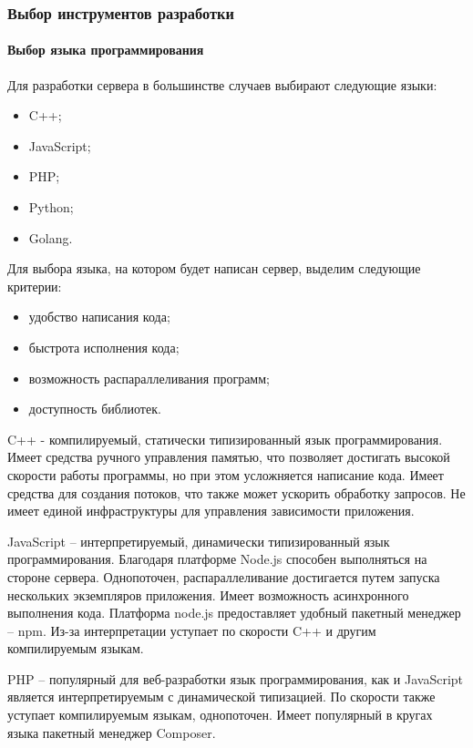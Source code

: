 
\subsubsection{Выбор инструментов разработки}

\paragraph{Выбор языка программирования}

Для разработки сервера в большинстве случаев выбирают следующие
языки:

\begin{itemize}
	\item C++;
	\item JavaScript;
	\item PHP;
	\item Python;
	\item Golang.
\end{itemize}

Для выбора языка, на котором будет написан сервер, выделим
следующие критерии:

\begin{itemize}
	\item удобство написания кода;
	\item быстрота исполнения кода;
	\item возможность распараллеливания программ;
	\item доступность библиотек.
\end{itemize}

C++ - компилируемый, статически типизированный язык
программирования. Имеет средства ручного управления памятью, что
позволяет достигать высокой скорости работы программы, но при этом
усложняется написание кода. Имеет средства для создания потоков, что также
может ускорить обработку запросов. Не имеет единой инфраструктуры для
управления зависимости приложения.

JavaScript – интерпретируемый, динамически типизированный язык
программирования. Благодаря платформе Node.js способен выполняться на
стороне сервера. Однопоточен, распараллеливание достигается путем запуска
нескольких экземпляров приложения. Имеет возможность асинхронного
выполнения кода. Платформа node.js предоставляет удобный пакетный
менеджер – npm. Из-за интерпретации уступает по скорости C++ и другим
компилируемым языкам.

PHP – популярный для веб-разработки язык программирования, как и
JavaScript является интерпретируемым с динамической типизацией. По
скорости также уступает компилируемым языкам, однопоточен. Имеет
популярный в кругах языка пакетный менеджер Composer.

